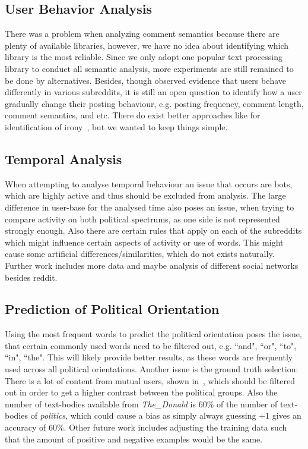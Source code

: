 \documentclass[runningheads,a4paper]{llncs}
\begin{document}
	\subsection{User Behavior Analysis}
	There was a problem when analyzing comment semantics because there are plenty of available libraries, however, we have no idea about identifying which library is the most reliable. Since we only adopt one popular text processing library to conduct all semantic analysis, more experiments are still remained to be done by alternatives. Besides, though observed evidence that users behave differently in various subreddits, it is still an open question to identify how a user gradually change their posting behaviour, e.g. posting frequency, comment length, comment semantics, and etc.
	There do exist better approaches like for identification of irony~\cite{Chenlo2013}, but we wanted to keep things simple.
	\subsection{Temporal Analysis}
	When attempting to analyse temporal behaviour an issue that occurs are bots, which are highly active and thus should be excluded from analysis. The large difference in user-base for the analysed time also poses an issue, when trying to compare activity on both political spectrums, as one side is not represented strongly enough. Also there are certain rules that apply on each of the subreddits which might influence certain aspects of activity or use of words. This might cause some artificial differences/similarities, which do not exists naturally. Further work includes more data and maybe analysis of different social networks besides reddit.
	\subsection{Prediction of Political Orientation}
	Using the most frequent words to predict the political orientation poses the issue, that certain commonly used words need to be filtered out, e.g. ``and", ``or", ``to", ``in", ``the". This will likely provide better results, as these words are frequently used across all political orientations. Another issue is the ground truth selection: There is a lot of content from mutual users, shown in~, which should be filtered out in order to get a higher contrast between the political groups.
	Also the number of text-bodies available from \textit{The\_Donald} is $60\%$ of the number of text-bodies of \textit{politics}, which could cause a bias as simply always guessing $+1$ gives an accuracy of $60\%$. Other future work includes adjusting the training data such that the amount of positive and negative examples would be the same.
	
\end{document}
